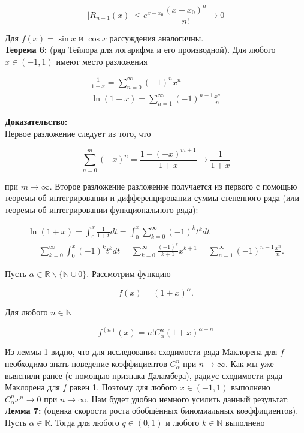 \documentclass[a4paper,12pt]{article} %
\begin{document}
$$
\left|R_{n-1}(x)\right| \leq e^{x-x_{0}} \frac{\left(x-x_{0}\right)^{n}}{n !} \rightarrow 0
$$

Для $f(x)=\sin x$ и $\cos x$ рассуждения аналогичны.\\
\textbf{Теорема 6:} (ряд Тейлора для логарифма и его производной). Для любого $x \in(-1,1)$ имеют место разложения

$$
\begin{gathered}
\frac{1}{1+x}=\sum_{n=0}^{\infty}(-1)^{n} x^{n} \\
\ln (1+x)=\sum_{n=1}^{\infty}(-1)^{n-1} \frac{x^{n}}{n}
\end{gathered}
$$

\textbf{Доказательство:}\\
Первое разложение следует из того, что

$$
\sum_{n=0}^{m}(-x)^{n}=\frac{1-(-x)^{m+1}}{1+x} \rightarrow \frac{1}{1+x}
$$

при $m \rightarrow \infty$. Второе разложение разложение получается из первого с помощью теоремы об интегрировании и дифференцировании суммы степенного ряда (или теоремы об интегрировании функционального ряда):

$$
\begin{gathered}
\ln (1+x)=\int_{0}^{x} \frac{1}{1+t} d t=\int_{0}^{x} \sum_{k=0}^{\infty}(-1)^{k} t^{k} d t \\
=\sum_{k=0}^{\infty} \int_{0}^{x}(-1)^{k} t^{k} d t=\sum_{k=0}^{\infty} \frac{(-1)^{k}}{k+1} x^{k+1}=\sum_{n=1}^{\infty}(-1)^{n-1} \frac{x^{n}}{n} .
\end{gathered}
$$

Пусть $\alpha \in \mathbb{R} \backslash\{\mathbb{N} \cup 0\}$. Рассмотрим функцию

$$
f(x)=(1+x)^{\alpha} .
$$

Для любого $n \in \mathbb{N}$

$$
f^{(n)}(x)=n ! C_{\alpha}^{n}(1+x)^{\alpha-n}
$$

Из леммы 1 видно, что для исследования сходимости ряда Маклорена для $f$ необходимо знать поведение коэффициентов $C_{\alpha}^{n}$ при $n \rightarrow \infty$. Как мы уже выяснили ранее (с помощью признака Даламбера), радиус сходимости ряда Маклорена для $f$ равен 1. Поэтому для любого $x \in(-1,1)$ выполнено $C_{\alpha}^{n} x^{n} \rightarrow 0$ при $n \rightarrow \infty$. Нам будет удобно немного усилить данный результат:\\
\textbf{Лемма 7:} (оценка скорости роста обобщённых биномиальных коэффициентов). Пусть $\alpha \in \mathbb{R}$. Тогда для любого $q \in(0,1)$ и любого $k \in \mathbb{N}$ выполнено
\end{document}
